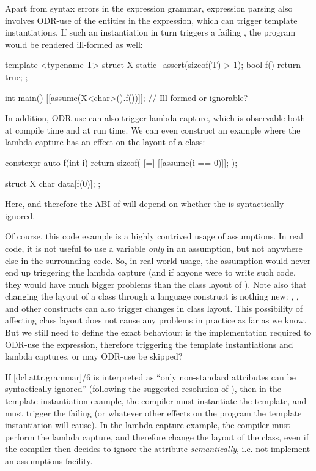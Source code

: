  Apart from syntax errors in the expression grammar, expression parsing also involves ODR-use of the entities in the expression, which can trigger template instantiations. If such an instantiation in turn triggers a failing , the program would be rendered ill-formed as well:
 
\begin{codeblock}
template <typename T>
struct X {
  static_assert(sizeof(T) > 1);
  bool f() { return true; }
};

int main() {
  [[assume(X<char>().f())]];  // Ill-formed or ignorable?
}
\end{codeblock}

In addition, ODR-use can also trigger lambda capture, which is observable both at compile time and at run time. We can even construct an example where the lambda capture has an effect on the layout of a class:

\begin{codeblock}
constexpr auto f(int i) {
  return sizeof( [=] { [[assume(i == 0)]]; } );
}

struct X {
  char data[f(0)];
};
\end{codeblock}

Here,  and therefore the ABI of  will depend on whether the  is syntactically ignored.

Of course, this code example is a highly contrived usage of assumptions. In real code, it is not useful to use a variable \emph{only} in an assumption, but not anywhere else in the surrounding code. So, in real-world usage, the assumption would never end up triggering the lambda capture (and if anyone were to write such code, they would have much bigger problems than the class layout of ). Note also that changing the layout of a class through a language construct is nothing new: , , and other constructs can also trigger changes in class layout. This possibility of affecting class layout does not cause any problems in practice as far as we know. But we still need to define the exact behaviour: is the implementation required to ODR-use the expression, therefore triggering the template instantiations and lambda captures, or may ODR-use be skipped?

If [dcl.attr.grammar]/6 is interpreted as ``only non-standard attributes can be syntactically ignored'' (following the suggested resolution of \cite{CWG2538}), then in the template instantiation example, the compiler must instantiate the template, and must trigger the failing  (or whatever other effects on the program the template instantiation will cause). In the lambda capture example, the compiler must perform the lambda capture, and therefore change the layout of the class, even if the compiler then decides to ignore the attribute \emph{semantically}, i.e. not implement an assumptions facility.

